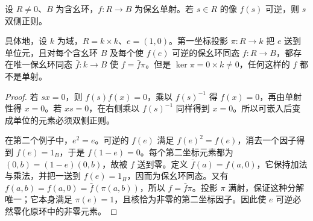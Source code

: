 \begin{proposition}\label{b2:prop:zero-divisor-inversion}
	设 \(R\ne0\)、\(B\) 为含幺环，\(f:R\to B\) 为保幺单射。若 \(s\in R\) 的像 \(f(s)\) 可逆，则 \(s\) 双侧正则。

	具体地，设 \(k\) 为域，\(R=k\times k\)、\(e=(1,0)\)。第一坐标投影 \(\pi:R\to k\) 把 \(e\) 送到单位元，且对每个含幺环 \(B\) 及每个使 \(f(e)\) 可逆的保幺环同态 \(f:R\to B\)，都存在唯一保幺环同态 \(\bar f:k\to B\) 使 \(f=\bar f\pi\)。但是 \(\ker\pi=0\times k\ne0\)，任何这样的 \(f\) 都不是单射。
\end{proposition}
\begin{proof}
	若 \(sx=0\)，则 \(f(s)f(x)=0\)，乘以 \(f(s)^{-1}\) 得 \(f(x)=0\)，再由单射性得 \(x=0\)。若 \(xs=0\)，在右侧乘以 \(f(s)^{-1}\) 同样得到 \(x=0\)。所以可嵌入后变成单位的元素必须双侧正则。

	在第二个例子中，\(e^2=e\)。可逆的 \(f(e)\) 满足 \(f(e)^2=f(e)\)，消去一个因子得到 \(f(e)=1_B\)，于是 \(f(1-e)=0\)。每个第二坐标元素都为 \((0,b)=(1-e)(0,b)\)，故被 \(f\) 送到零。定义 \(\bar f(a)=f(a,0)\)，它保持加法与乘法，并把一送到 \(f(e)=1_B\)，因而为保幺环同态。又有 \(f(a,b)=f(a,0)=\bar f(\pi(a,b))\)，所以 \(f=\bar f\pi\)。投影 \(\pi\) 满射，保证这种分解唯一；它本身满足 \(\pi(e)=1\)，且核恰为非零的第二坐标因子。因此使 \(e\) 可逆必然零化原环中的非零元素。
\end{proof}
